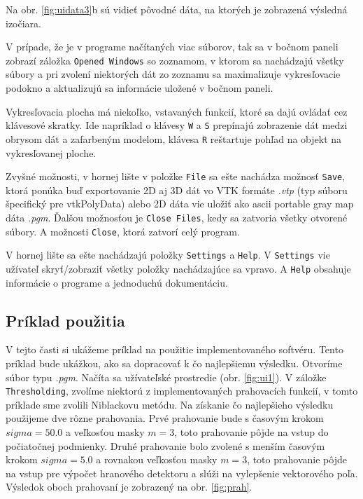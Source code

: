 \documentclass[a4paper,11pt,oneside]{article}%
\begin{document}
Na obr. \ref{fig:uidata3}b sú vidieť pôvodné dáta, na ktorých je zobrazená výsledná izočiara.

V prípade, že je v programe načítaných viac súborov, tak sa v bočnom paneli zobrazí záložka  \texttt{Opened Windows} so zoznamom, v ktorom sa nachádzajú všetky súbory a pri zvolení niektorých dát zo zoznamu sa maximalizuje vykresľovacie podokno a aktualizujú sa informácie uložené v bočnom paneli.  

Vykresľovacia plocha má niekoľko, vstavaných funkcií, ktoré sa dajú ovládať cez klávesové skratky. Ide napríklad o klávesy \texttt{W} a \texttt{S} prepínajú zobrazenie dát medzi obrysom dát a zafarbeným modelom, klávesa \texttt{R} reštartuje pohľad na objekt na vykresľovanej ploche.
 
Zvyšné možnosti, v hornej lište v položke \texttt{File} sa ešte nachádza možnosť \texttt{Save}, ktorá ponúka buď exportovanie 2D aj 3D dát vo VTK formáte \textit{.vtp} (typ súboru špecifický pre vtkPolyData) alebo 2D dáta vie uložiť ako ascii portable gray map dáta \textit{.pgm}. Ďalšou možnosťou je \texttt{Close Files}, kedy sa zatvoria všetky otvorené súbory. A možnosti \texttt{Close}, ktorá zatvorí celý program.

V hornej lište sa ešte nachádzajú položky \texttt{Settings} a \texttt{Help}. V \texttt{Settings} vie užívateľ skryť/zobraziť všetky položky nachádzajúce sa vpravo. A \texttt{Help} obsahuje informácie o programe a jednoduchú dokumentáciu.

\subsection{Príklad použitia}
V tejto časti si ukážeme príklad na použitie implementovaného softvéru. Tento príklad bude ukážkou, ako sa dopracovať k čo najlepšiemu výsledku. Otvoríme súbor typu \textit{.pgm}. Načíta sa užívateľské prostredie (obr. \ref{fig:ui1}). V záložke \texttt{Thresholding}, zvolíme niektorú z implementovaných prahovacích funkcií, v tomto príklade sme zvolili Niblackovu metódu. Na získanie čo najlepšieho výsledku použijeme dve rôzne prahovania. Prvé prahovanie bude s časovým krokom $sigma = 50.0$ a veľkosťou masky $m = 3$, toto prahovanie pôjde na vstup do počiatočnej podmienky. Druhé prahovanie bolo zvolené s menším časovým krokom $sigma = 5.0$ a rovnakou veľkosťou masky $m = 3$, toto prahovanie pôjde na vstup pre výpočet hranového detektoru a slúži na vylepšenie vektorového poľa. Výsledok oboch prahovaní je zobrazený na obr. \ref{fig:prah}.
\end{document}
